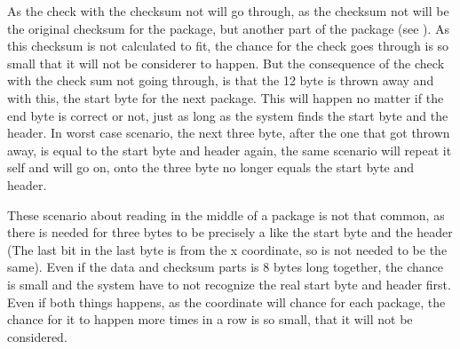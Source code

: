 As the check with the checksum not will go through, as the checksum not will be the original checksum for the package, but another part of the package (see ). As this checksum is not calculated to fit, the chance for the check goes through is so small that it will not be considerer to happen. But the consequence of the check with the check sum not going through, is that the 12 byte is thrown away and with this, the start byte for the next package. This will happen no matter if the end byte is correct or not, just as long as the system finds the start byte and the header. In worst case scenario, the next three byte, after the one that got thrown away, is equal to the start byte and header again, the same scenario will repeat it self and will go on, onto the three byte no longer equals the start byte and header.

These scenario about reading in the middle of a package is not that common, as there is needed for three bytes to be precisely a like the start byte and the header (The last bit in the last byte is from the x coordinate, so is not needed to be the same). Even if the data and checksum parts is 8 bytes long together, the chance is small and the system have  to not recognize the real start byte and header first. Even if both things happens, as the coordinate will chance for each package, the chance for it to happen more times in a row is so small, that it will not be considered.


